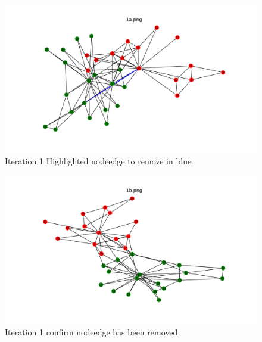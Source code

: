 \documentclass[12pt]{article}
\begin{document}
\subsection*{\color{blue}{Answer}}


\begin{figure}[H]
\centering
\includegraphics[trim=0 0 0 0, clip, width=\textwidth] {1a.png}
\caption{Iteration 1 Highlighted nodeedge to remove in blue }
\label{fig:q11a}
\end{figure}

\begin{figure}[H]
\centering
\includegraphics[trim=0 0 0 0, clip, width=\textwidth] {1b.png}
\caption{Iteration 1 confirm nodeedge has been removed }
\label{fig:q11b}
\end{figure}
\end{document}
